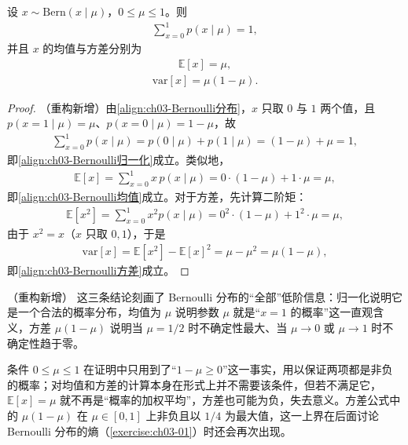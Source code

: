 \documentclass[../../main.tex]{subfiles}
\begin{document}
\begin{proposition}\label{proposition:ch03-Bernoulli矩}
设 $x\sim\mathrm{Bern}(x\mid\mu)$，$0\leqslant\mu\leqslant1$。则
\begin{align}
\sum_{x=0}^{1}p(x\mid\mu)=1,
\label{align:ch03-Bernoulli归一化}
\end{align}
并且 $x$ 的均值与方差分别为
\begin{align}
\mathbb{E}[x]=\mu,
\label{align:ch03-Bernoulli均值}
\end{align}
\begin{align}
\mathrm{var}[x]=\mu(1-\mu).
\label{align:ch03-Bernoulli方差}
\end{align}
\end{proposition}
\begin{proof}
（重构新增）由\eqref{align:ch03-Bernoulli分布}，$x$ 只取 $0$ 与 $1$ 两个值，且 $p(x=1\mid\mu)=\mu$、$p(x=0\mid\mu)=1-\mu$，故
\begin{align*}
\sum_{x=0}^{1}p(x\mid\mu)=p(0\mid\mu)+p(1\mid\mu)=(1-\mu)+\mu=1,
\end{align*}
即\eqref{align:ch03-Bernoulli归一化}成立。类似地，
\begin{align*}
\mathbb{E}[x]=\sum_{x=0}^{1}x\,p(x\mid\mu)=0\cdot(1-\mu)+1\cdot\mu=\mu,
\end{align*}
即\eqref{align:ch03-Bernoulli均值}成立。对于方差，先计算二阶矩：
\begin{align*}
\mathbb{E}[x^{2}]=\sum_{x=0}^{1}x^{2}p(x\mid\mu)=0^{2}\cdot(1-\mu)+1^{2}\cdot\mu=\mu,
\end{align*}
由于 $x^{2}=x$（$x$ 只取 $0,1$），于是
\begin{align*}
\mathrm{var}[x]=\mathbb{E}[x^{2}]-\mathbb{E}[x]^{2}=\mu-\mu^{2}=\mu(1-\mu),
\end{align*}
即\eqref{align:ch03-Bernoulli方差}成立。
\end{proof}

\begin{remark}（重构新增）
这三条结论刻画了 Bernoulli 分布的“全部”低阶信息：归一化说明它是一个合法的概率分布，均值为 $\mu$ 说明参数 $\mu$ 就是“$x=1$ 的概率”这一直观含义，方差 $\mu(1-\mu)$ 说明当 $\mu=1/2$ 时不确定性最大、当 $\mu\to0$ 或 $\mu\to1$ 时不确定性趋于零。

条件 $0\leqslant\mu\leqslant1$ 在证明中只用到了“$1-\mu\geqslant0$”这一事实，用以保证两项都是非负的概率；对均值和方差的计算本身在形式上并不需要该条件，但若不满足它，$\mathbb{E}[x]=\mu$ 就不再是“概率的加权平均”，方差也可能为负，失去意义。方差公式中的 $\mu(1-\mu)$ 在 $\mu\in[0,1]$ 上非负且以 $1/4$ 为最大值，这一上界在后面讨论 Bernoulli 分布的熵（\cref{exercise:ch03-01}）时还会再次出现。
\end{remark}
\end{document}
